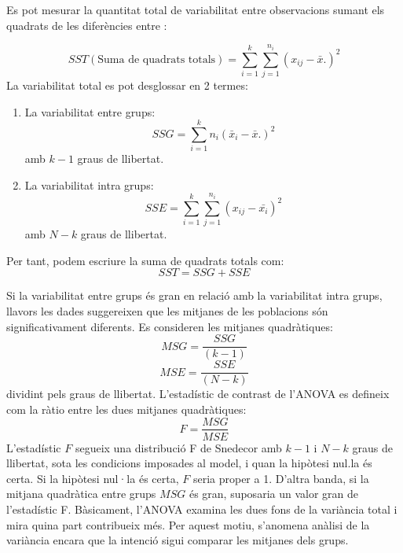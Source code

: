 \documentclass[english]{article}
\begin{document}
Es pot mesurar la quantitat total de variabilitat entre observacions sumant els quadrats de les diferències entre :

\begin{equation*}
SST(\text{Suma de quadrats totals}) = \sum_{i=1}^{k} \sum_{j=1}^{n_{i}} (x_{ij} - \bar{x}.)^2
\end{equation*}
La variabilitat total es pot desglossar en 2 termes:
\begin{enumerate}
\item La variabilitat entre grups:
\begin{equation*}
SSG = \sum_{i=1}^{k} n_{i}(\bar{x}_{i} - \bar{x}.)^2
\end{equation*}
amb $k-1$ graus de llibertat.
\item La variabilitat intra grups:
\begin{equation*}
SSE = \sum_{i=1}^{k} \sum_{j=1}^{n_{i}} (x_{ij} - \bar{x_{i}})^2
\end{equation*}
amb $N-k$ graus de llibertat.
\end{enumerate}
Per tant, podem escriure la suma de quadrats totals com:
\begin{equation*}
SST = SSG + SSE
\end{equation*}

Si la variabilitat entre grups és gran en relació amb la variabilitat intra grups, llavors les dades suggereixen que les mitjanes de les poblacions són significativament diferents. Es consideren les mitjanes quadràtiques:
\begin{equation*}
MSG = \frac{SSG}{(k-1)}
\end{equation*}
\begin{equation*}
MSE = \frac{SSE}{(N-k)}
\end{equation*}
dividint pels graus de llibertat. L'estadístic de contrast de l'ANOVA es defineix com la ràtio entre les dues mitjanes quadràtiques:
\begin{equation*}
F = \frac{MSG}{MSE}
\end{equation*}
L'estadístic $F$ segueix una distribució F de Snedecor amb $k-1$ i $N-k$ graus de llibertat, sota les condicions imposades al model, i quan la hipòtesi nul.la és certa. Si la hipòtesi nul·la és certa, $F$ seria proper a 1. D'altra banda, si la mitjana quadràtica entre grups $MSG$ és gran, suposaria un valor gran de l'estadístic F. Bàsicament, l'ANOVA examina les dues fons de la variància total i mira quina part contribueix més. Per aquest motiu, s'anomena anàlisi de la variància encara que la intenció sigui comparar les mitjanes dels grups.
\\
\end{document}
